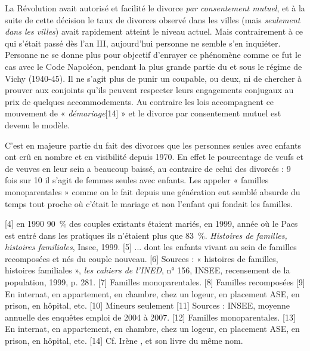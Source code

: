  La Révolution avait autorisé et facilité le divorce \emph{par consentement mutuel}, et à la suite de cette décision le taux de divorces observé dans les villes (mais \emph{seulement dans les villes}) avait rapidement atteint le niveau actuel. Mais contrairement à ce qui s'était passé dès l'an III, aujourd'hui personne ne semble s'en inquiéter. Personne ne se donne plus pour objectif d'enrayer ce phénomène comme ce fut le cas avec le Code Napoléon, pendant la plus grande partie du  et sous le régime de Vichy (1940-45). Il ne s'agit plus de punir un coupable, ou deux, ni de chercher à prouver aux conjoints qu'ils peuvent respecter leurs engagements conjugaux au prix de quelques accommodements. Au contraire les lois accompagnent ce mouvement de « \emph{démariage}[14] » et le divorce par consentement mutuel est devenu le modèle. 

 C'est en majeure partie du fait des divorces que les personnes seules avec enfants ont crû en nombre et en visibilité depuis 1970. En effet le pourcentage de veufs et de veuves en leur sein a beaucoup baissé, au contraire de celui des divorcés : 9 fois sur 10 il s'agit de femmes seules avec enfants. Les appeler « familles monoparentales » comme on le fait depuis une génération eut semblé absurde du temps tout proche où c'était le mariage et non l'enfant qui fondait les familles. 
 
[4] en 1990 90~\% des couples existants étaient mariés, en 1999, année où le Pacs est entré dans les pratiques ils n'étaient plus que 83~\%. \emph{Histoires de familles, histoires familiales}, Insee, 1999.
[5] ... dont les  enfants vivant au sein de familles recomposées et nés du couple nouveau.
[6] Sources : « histoires de familles, histoires familiales », \emph{les cahiers de l'INED}, n° 156, INSEE, recensement de la population, 1999, p. 281.
[7] Familles monoparentales.
[8] Familles recomposées
[9] En internat, en appartement, en chambre, chez un logeur, en placement ASE, en prison, en hôpital, etc.
[10] Mineurs seulement
[11] Sources : INSEE, moyenne annuelle des enquêtes emploi de 2004 à 2007.
[12] Familles monoparentales.
[13] En internat, en appartement, en chambre, chez un logeur, en placement ASE, en prison, en hôpital, etc.
[14] Cf. Irène , et son livre du même nom.
